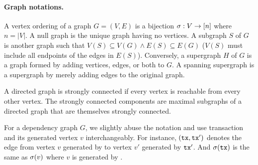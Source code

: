 \paragraph{Graph notations.}
%
A vertex ordering of a graph $G = (V , E)$ is a bijection $\sigma : V \rightarrow [n]$ where $n = |V|$.
%
A null graph is the unique graph having no vertices.
%
A subgraph $S$ of $G$ is another graph such that $V(S) \subseteq V(G) \wedge E(S) \subseteq E(G)$ ($V(S)$ must include all endpoints of the edges in $E(S)$).
%
Conversely, a supergraph $H$ of $G$ is a graph formed by adding vertices, edges, or both to $G$.
%
A spanning supergraph is a supergraph by merely adding edges to the original graph.

A directed graph is strongly connected if every vertex is reachable from every other vertex.
%
The strongly connected components are maximal subgraphs of a directed graph that are themselves strongly connected.

For a dependency graph $G$, we slightly abuse the notation and use transaction \tx and its generated vertex $v$ interchangeably.
%
For instance, $(\mathtt{tx}, \mathtt{tx}')$ denotes the edge from vertex $v$ generated by \tx to vertex $v'$ generated by $\mathtt{tx}'$.
%
And $\sigma(\mathtt{tx})$ is the same as  $\sigma(v)$ where $v$ is generated by \tx.

